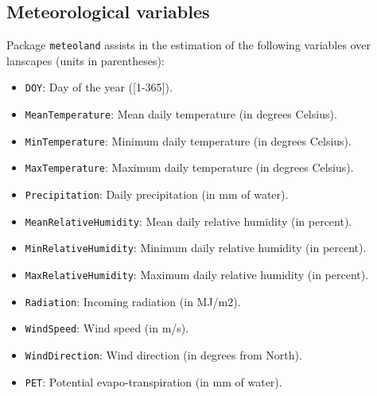 \documentclass[11pt,a4paper]{article}
\begin{document}
\subsection{Meteorological variables}
Package \texttt{meteoland} assists in the estimation of the following variables over lanscapes (units in parentheses):
\begin{itemize}
\item{\texttt{DOY}: Day of the year ([1-365]).}
\item{\texttt{MeanTemperature}: Mean daily temperature (in degrees Celsius).}
\item{\texttt{MinTemperature}: Minimum daily temperature (in degrees Celsius).}
\item{\texttt{MaxTemperature}: Maximum daily temperature (in degrees Celsius).}
\item{\texttt{Precipitation}: Daily precipitation (in mm of water).}
\item{\texttt{MeanRelativeHumidity}: Mean daily relative humidity (in percent).}
\item{\texttt{MinRelativeHumidity}: Minimum daily relative humidity (in percent).}
\item{\texttt{MaxRelativeHumidity}: Maximum daily relative humidity (in percent).}
\item{\texttt{Radiation}: Incoming radiation (in MJ/m2).}
\item{\texttt{WindSpeed}: Wind speed (in m/s).}
\item{\texttt{WindDirection}: Wind direction (in degrees from North).}
\item{\texttt{PET}: Potential evapo-transpiration (in mm of water).}
\end{itemize}
\end{document}
